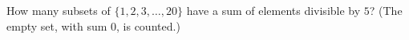 How many subsets of $\{1,2,3,\dots,20\}$ have a sum of elements divisible by $5$? (The empty set, with sum $0$, is counted.)
